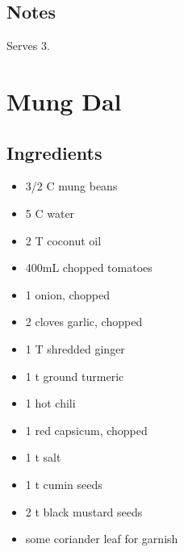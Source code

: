 \documentclass[letterpaper,10pt,english]{sphinxmanual}
\begin{document}
\section{Notes}
\label{tempeh_sauerkraut:notes}
Serves 3.


\chapter{Mung Dal}
\label{mung_dal:mung-dal}\label{mung_dal::doc}

\section{Ingredients}
\label{mung_dal:ingredients}\begin{itemize}
\item {} 
3/2 C     mung beans

\item {} 
5 C       water

\item {} 
2 T       coconut oil

\item {} 
400mL     chopped tomatoes

\item {} 
1         onion, chopped

\item {} 
2         cloves garlic, chopped

\item {} 
1 T       shredded ginger

\item {} 
1 t       ground turmeric

\item {} 
1         hot chili

\item {} 
1         red capsicum, chopped

\item {} 
1 t       salt

\item {} 
1 t       cumin seeds

\item {} 
2 t       black mustard seeds

\item {} 
some      coriander leaf for garnish

\end{itemize}
\end{document}

